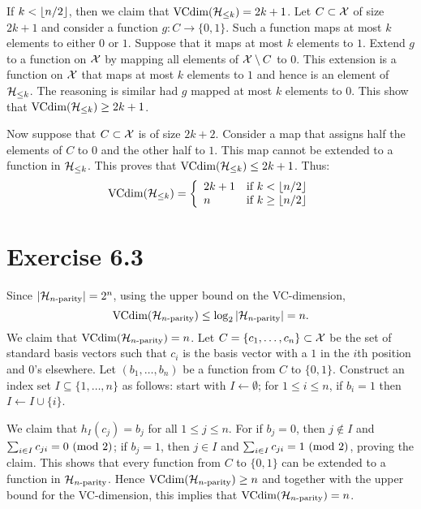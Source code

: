 If $k < \left \lfloor n / 2 \right \rfloor$, then we claim that  $\text{VCdim} (\mathcal{H}_{\leq k}) = 2k + 1$.
Let $C \subset \mathcal{X}$ of size $2k + 1$ and consider a function
$g \colon C \rightarrow \{0, 1\}$. Such a function maps at most $k$ elements
to either $0$ or $1$. Suppose that it maps at most $k$ elements to $1$. Extend
$g$ to a function on $\mathcal{X}$ by mapping all elements of $\mathcal{X} \setminus C$ to $0$.
This extension is a function on $\mathcal{X}$ that maps at most $k$ elements to $1$
and hence is an element of $\mathcal{H}_{\leq k}$. The reasoning is similar had $g$
mapped at most $k$ elements to $0$. This show that
$\text{VCdim}(\mathcal{H}_{\leq k}) \geq 2k + 1$.

Now suppose that $C \subset \mathcal{X}$ is of size $2k + 2$. Consider a map
that assigns half the elements of $C$ to $0$ and the other half to $1$.
This map cannot be extended to a function in $\mathcal{H}_{\leq k}$. This
proves that $\text{VCdim} (\mathcal{H}_{\leq k}) \leq 2k + 1$. Thus:
\[\text{VCdim}(\mathcal{H}_{\leq k})
= \left \{ \begin{array}{ll}
                2k + 1  & \text{if } k < \left \lfloor n / 2 \right \rfloor \\
                n       & \text{if } k \geq \left \lfloor n / 2 \right \rfloor
           \end{array} \right .
\]

\section*{Exercise 6.3}

Since $|\mathcal{H}_{n\text{-parity}}| = 2^n$, using the upper bound on the VC-dimension,
\[\text{VCdim} (\mathcal{H}_{n\text{-parity}}) \leq \log_2 |\mathcal{H}_{n\text{-parity}}| = n.\]
We claim that $\text{VCdim} (\mathcal{H}_{n\text{-parity}}) = n$. Let $C = \{c_1, \ldots, c_n\} \subset
\mathcal{X}$ be the set of standard basis vectors such that $c_i$ is the basis
vector with a $1$ in the $i$th position and $0$'s
elsewhere. Let $(b_1, \ldots, b_n)$ be a function from $C$ to $\{0, 1\}$.
Construct an index set $I \subseteq \{1, \ldots, n\}$ as follows:
start with $I \leftarrow \emptyset$; for $1 \leq i \leq n$, if $b_i = 1$
then $I \leftarrow I \cup \{i\}$.

We claim that $h_I(c_j) = b_j$ for all $1 \leq j \leq n$. For if $b_j = 0$,
then $j \notin I$ and $\sum_{i \in I} c_{j i} = 0 \ (\mathrm{mod}\ 2)$; if $b_j = 1$,
then $j \in I$ and $\sum_{i \in I} c_{j i} = 1 \ (\mathrm{mod}\ 2)$, proving the claim.
This shows that every function from $C$ to $\{0, 1\}$ can be extended to a function
in $\mathcal{H}_{n\text{-parity}}$. Hence $\text{VCdim} (\mathcal{H}_{n\text{-parity}}) \geq n$ and together with the upper
bound for the VC-dimension, this implies that $\text{VCdim} (\mathcal{H}_{n\text{-parity}}) = n$.

